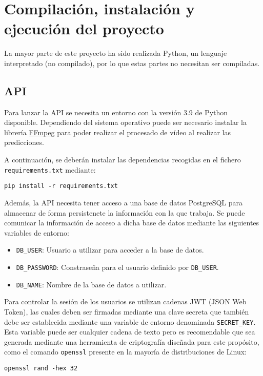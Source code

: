 \section{Compilación, instalación y ejecución del proyecto}

La mayor parte de este proyecto ha sido realizada Python, un lenguaje
interpretado (no compilado), por lo que estas partes no necesitan ser
compiladas.

\subsection{API}

Para lanzar la API se necesita un entorno con la versión 3.9 de Python
disponible. Dependiendo del sistema operativo puede ser necesario instalar la
librería \href{https://ffmpeg.org}{FFmpeg} para poder realizar el procesado de
vídeo al realizar las predicciones.

A continuación, se deberán instalar las dependencias recogidas en el fichero
\texttt{requirements.txt} mediante:

\texttt{pip install -r requirements.txt}

Además, la API necesita tener acceso a una base de datos PostgreSQL para
almacenar de forma persistenete la información con la que trabaja. Se puede
comunicar la información de acceso a dicha base de datos mediante las siguientes
variables de entorno:

\begin{itemize}
    \item \texttt{DB\_USER}: Usuario a utilizar para acceder a la base de datos.
    \item \texttt{DB\_PASSWORD}: Constraseña para el usuario definido por
    \texttt{DB\_USER}.
    \item \texttt{DB\_NAME}: Nombre de la base de datos a utilizar.
\end{itemize}

Para controlar la sesión de los usuarios se utilizan cadenas JWT (JSON Web
Token), las cuales deben ser firmadas mediante una clave secreta que también
debe ser establecida mediante una variable de entorno denominada
\texttt{SECRET\_KEY}. Esta variable puede ser cualquier cadena de texto pero es
recomendable que sea generada mediante una herramienta de criptografía diseñada
para este propósito, como el comando \texttt{openssl} presente en la mayoría de
distribuciones de Linux:

\texttt{openssl rand -hex 32}

